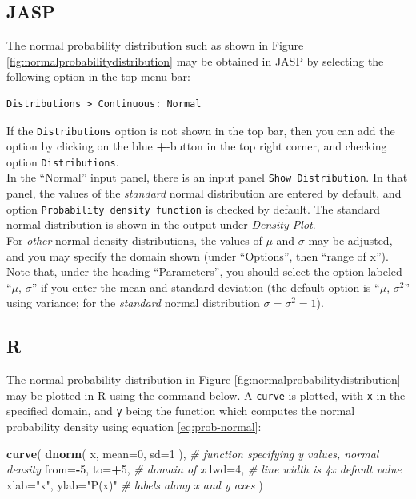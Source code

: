 \documentclass[
]{book}
\newenvironment{Shaded}{\begin{snugshade}}{\end{snugshade}}
\newcommand{\CommentTok}[1]{\textcolor[rgb]{0.56,0.35,0.01}{\textit{#1}}}
\newcommand{\DataTypeTok}[1]{\textcolor[rgb]{0.13,0.29,0.53}{#1}}
\newcommand{\DecValTok}[1]{\textcolor[rgb]{0.00,0.00,0.81}{#1}}
\newcommand{\KeywordTok}[1]{\textcolor[rgb]{0.13,0.29,0.53}{\textbf{#1}}}
\newcommand{\NormalTok}[1]{#1}
\newcommand{\OperatorTok}[1]{\textcolor[rgb]{0.81,0.36,0.00}{\textbf{#1}}}
\newcommand{\StringTok}[1]{\textcolor[rgb]{0.31,0.60,0.02}{#1}}
\begin{document}
\hypertarget{jasp-5}{%
\subsection{JASP}\label{jasp-5}}

The normal probability distribution such as shown in Figure \ref{fig:normalprobabilitydistribution} may be obtained in JASP by selecting the following option in the top menu bar:

\begin{verbatim}
Distributions > Continuous: Normal
\end{verbatim}

If the \texttt{Distributions} option is not shown in the top bar, then you can add the option by clicking on the blue \textbf{+}-button in the top right corner, and checking option \texttt{Distributions}.\\
In the ``Normal'' input panel, there is an input panel \texttt{Show\ Distribution}. In that panel, the values of the \emph{standard} normal distribution are entered by default, and option \texttt{Probability\ density\ function} is checked by default. The standard normal distribution is shown in the output under \emph{Density Plot}.\\
For \emph{other} normal density distributions, the values of \(\mu\) and \(\sigma\) may be adjusted, and you may specify the domain shown (under ``Options'', then ``range of x'').
Note that, under the heading ``Parameters'', you should select the option labeled ``\(\mu\), \(\sigma\)'' if you enter the mean and standard deviation (the default option is ``\(\mu\), \(\sigma^2\)'' using variance; for the \emph{standard} normal distribution \(\sigma=\sigma^2=1\)).

\hypertarget{r-4}{%
\subsection{R}\label{r-4}}

The normal probability distribution in Figure \ref{fig:normalprobabilitydistribution} may be plotted in R using the command below. A \texttt{curve} is plotted, with \texttt{x} in the specified domain, and \texttt{y} being the function which computes the normal probability density using equation \eqref{eq:prob-normal}:

\begin{Shaded}
\begin{Highlighting}[]
\KeywordTok{curve}\NormalTok{( }\KeywordTok{dnorm}\NormalTok{( x, }\DataTypeTok{mean=}\DecValTok{0}\NormalTok{, }\DataTypeTok{sd=}\DecValTok{1}\NormalTok{ ), }\CommentTok{\# function specifying y values, normal density}
       \DataTypeTok{from=}\OperatorTok{{-}}\DecValTok{5}\NormalTok{, }\DataTypeTok{to=}\OperatorTok{+}\DecValTok{5}\NormalTok{, }\CommentTok{\# domain of x}
       \DataTypeTok{lwd=}\DecValTok{4}\NormalTok{, }\CommentTok{\# line width is 4x default value}
       \DataTypeTok{xlab=}\StringTok{"x"}\NormalTok{, }\DataTypeTok{ylab=}\StringTok{"P(x)"} \CommentTok{\# labels along x and y axes}
\NormalTok{       )}
\end{Highlighting}
\end{Shaded}
\end{document}
